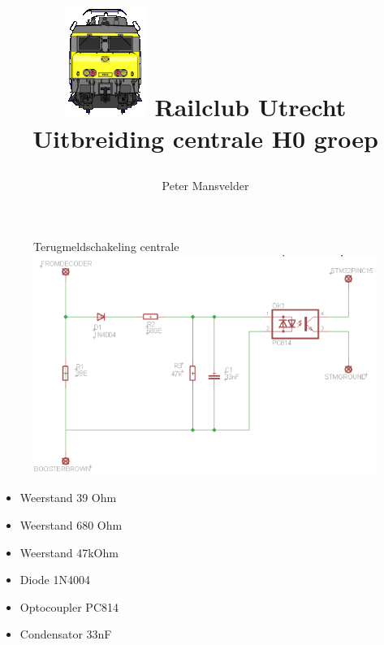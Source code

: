 \documentclass[12pt,a4paper]{report}
\begin{document}
\title{
\includegraphics[scale=2.0]{images/rcu_logo}
\makebox[\linewidth]{\rule{\textwidth}{0.4pt}}
Railclub Utrecht
\vfill
Uitbreiding centrale H0 groep\\
\makebox[\linewidth]{\rule{\textwidth}{0.4pt}}
\vfill
\small
\author{Peter Mansvelder}}

\maketitle

\begin{figure}[ht]
  \captionbox
  {Terugmeldschakeling centrale}
  {\includegraphics[scale=0.7]{images/rcu-MDRRCII-ack}}
\end{figure}

\begin{itemize}
\item Weerstand 39 Ohm
\item Weerstand 680 Ohm
\item Weerstand 47kOhm
\item Diode 1N4004
\item Optocoupler PC814
\item Condensator 33nF
\end{itemize}
\end{document}
